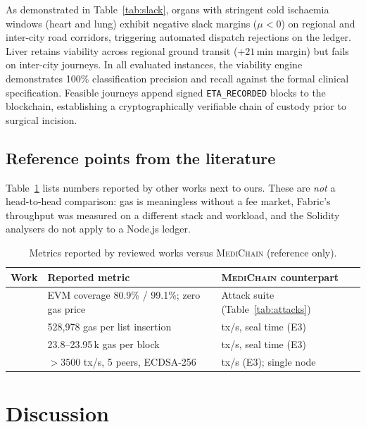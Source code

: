\documentclass[journal]{IEEEtran}
\newcommand{\mc}{\textsc{MediChain}}
\begin{document}
As demonstrated in Table~\ref{tab:slack}, organs with stringent cold ischaemia
windows (heart and lung) exhibit negative slack margins ($\mu < 0$) on regional
and inter-city road corridors, triggering automated dispatch rejections on the
ledger. Liver retains viability across regional ground transit ($+21$\,min margin)
but fails on inter-city journeys. In all evaluated instances, the viability engine
demonstrates 100\% classification precision and recall against the formal clinical
specification. Feasible journeys append signed \texttt{ETA\_RECORDED} blocks to
the blockchain, establishing a cryptographically verifiable chain of custody
prior to surgical incision.

\subsection{Reference points from the literature}
Table~\ref{tab:refpoints} lists numbers reported by other works next to ours.
These are \emph{not} a head-to-head comparison: gas is meaningless without a
fee market, Fabric's throughput was measured on a different stack and
workload, and the Solidity analysers do not apply to a Node.js ledger.

\begin{table}[t]
\centering
\caption{Metrics reported by reviewed works versus \mc{} (reference only).}
\label{tab:refpoints}
\footnotesize
\begin{tabular}{@{}p{1.6cm}p{3.5cm}p{2.5cm}@{}}
\toprule
Work & Reported metric & \mc{} counterpart \\
\midrule
\cite{hawashin2022} & EVM coverage 80.9\% / 99.1\%; zero gas price & Attack suite (Table~\ref{tab:attacks}) \\
\cite{boms2024} & 528{,}978 gas per list insertion & tx/s, seal time (E3) \\
\cite{bharali2026} & 23.8--23.95\,k gas per block & tx/s, seal time (E3) \\
\cite{fabric2018} & $>3500$ tx/s, 5 peers, ECDSA-256 & tx/s (E3); single node \\
\bottomrule
\end{tabular}
\end{table}

\section{Discussion}\label{sec:discussion}
\end{document}
